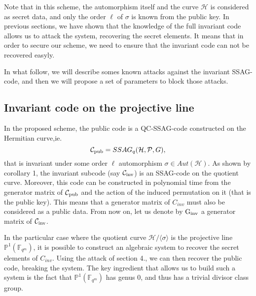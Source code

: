 \documentclass[10pt]{article}
\newcommand{\s}{\vspace{0.3cm}}
\newcommand{\fqm}{\mathbb{F}_{q^m}}
\newcommand{\PR}{\mathcal{P}}
\begin{document}
Note that in this scheme, \color{red}the automorphism itself and the curve $\mathcal{H}$ is considered as secret data, and only the order $\ell$ of $\sigma$ is known from the public key. \color{black} In previous sections, we have shown that the knowledge of the full invariant code allows us to attack the system, recovering the secret elements. It means that in order to secure our scheme, we need to ensure that the invariant code can not be recovered easyly. 

\s

In what follow, we will describe somes known attacks against the invariant SSAG-code, and then we will propose a set of parameters to block those attacks.

\s

\subsection{Invariant code on the projective line}

\s

In the proposed scheme, the public code is a QC-SSAG-code constructed on the Hermitian curve,ie. 
\[\mathcal{C}_{\rm pub} = SSAG_q(\mathcal{H},\PR,G),\]
that is invariant under some order $\ell$ automorphism $\sigma \in Aut(\mathcal{H})$. As shown by corollary 1, the invariant subcode (say $\mathcal{C}_{\rm inv}$) is an SSAG-code on the quotient curve. Moreover, this code can be constructed in polynomial time from the generator matrix of $\mathcal{C}_{\rm pub}$ and the action of the induced permutation on it (that is the public key). This means that a generator matrix of $C_{inv}$ must also be considered as a public data. From now on, let us denote by $\rm G_{inv}$ a generator matrix of $\mathcal{C}_{\rm inv}$.  

\s

In the particular case where the quotient curve $\mathcal{H}/\langle\sigma\rangle$ is the projective line $\mathbb{P}^1(\fqm)$, it is possible to construct an algebraic system to recover the secret elements of $C_{inv}$. Using the attack of section 4., we can then recover the public code, breaking the system. The key ingredient that allows us to build such a system is the fact that $\mathbb{P}^1(\fqm)$ has genus $0$, and thus has a trivial divisor class group. 

\s
\end{document}

